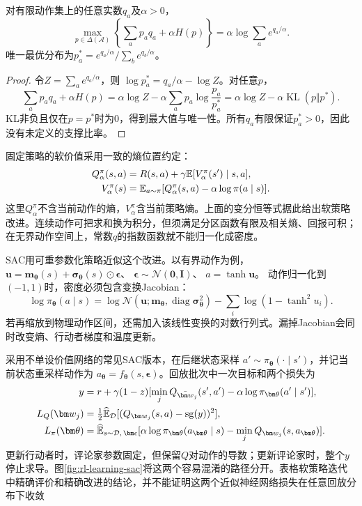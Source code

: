 \begin{theorem}[熵正则的变分恒等式]
  \label{thm:rl-learning-entropy-variational}
  对有限动作集上的任意实数$q_a$及$\alpha>0$，
  \[
    \max_{p\in\Delta(\mathcal A)}
       \left\{\sum_a p_a q_a+\alpha H(p)\right\}
      =\alpha\log\sum_a e^{q_a/\alpha}.
  \]
  唯一最优分布为$p_a^*=e^{q_a/\alpha}/\sum_b e^{q_b/\alpha}$。
\end{theorem}
\begin{proof}
  令$Z=\sum_a e^{q_a/\alpha}$，则
  $\log p_a^*=q_a/\alpha-\log Z$。对任意$p$，
  \[
    \sum_a p_aq_a+\alpha H(p)
      =\alpha\log Z
          -\alpha\sum_a p_a\log\frac{p_a}{p_a^*}
      =\alpha\log Z-\alpha\operatorname{KL}(p\Vert p^*).
  \]
  KL非负且仅在$p=p^*$时为0，得到最大值与唯一性。所有$q_a$有限保证$p_a^*>0$，因此没有未定义的支撑比率。
\end{proof}

固定策略的软价值采用一致的熵位置约定：
\begin{align}
  Q_\alpha^\pi(s,a)
    &=R(s,a)+\gamma\mathbb E[V_\alpha^\pi(s')\mid s,a],
       \notag\\
  V_\alpha^\pi(s)
    &=\mathbb E_{a\sim\pi}
        [Q_\alpha^\pi(s,a)-\alpha\log\pi(a\mid s)].
  \label{eq:rl-learning-soft-bellman}
\end{align}
这里$Q_\alpha^\pi$不含当前动作的熵，$V_\alpha^\pi$含当前策略熵。上面的变分恒等式据此给出软策略改进。连续动作可把求和换为积分，但须满足分区函数有限及相关熵、回报可积；在无界动作空间上，常数$q$的指数函数就不能归一化成密度。

SAC用可重参数化策略近似这个改进。以有界动作为例，
$\bm u=\bm m_{\bm\theta}(s)+\bm\sigma_{\bm\theta}(s)\odot\bm\epsilon$、
$\bm\epsilon\sim\mathcal N(\bm0,\bm I)$、
$a=\tanh\bm u$。
动作归一化到$(-1,1)$时，密度必须包含变换Jacobian：
\[
  \log\pi_{\bm\theta}(a\mid s)
    =\log\mathcal N(\bm u;\bm m_{\bm\theta},
                           \operatorname{diag}\bm\sigma_{\bm\theta}^2)
       -\sum_i\log(1-\tanh^2u_i).
\]
若再缩放到物理动作区间，还需加入该线性变换的对数行列式。漏掉Jacobian会同时改变熵、行动者梯度和温度更新。

采用不单设价值网络的常见SAC版本，在后继状态采样
$a'\sim\pi_{\bm\theta}(\cdot\mid s')$，并记当前状态重采样动作为
$a_{\bm\theta}=f_{\bm\theta}(s,\bm\epsilon)$。回放批次中一次目标和两个损失为
\begin{align}
  y&=r+\gamma(1-z)
       [\min_j Q_{\bar{\bm w}_j}(s',a')
                       -\alpha\log\pi_{\bm\theta}(a'\mid s')],
       \notag\\
  L_Q(\bm w_j)&=\tfrac12\widehat{\mathbb E}_{\mathcal D}
                           [(Q_{\bm w_j}(s,a)-\operatorname{sg}(y))^2],
       \notag\\
  L_\pi(\bm\theta)&=
       \widehat{\mathbb E}_{s\sim\mathcal D,\,\bm\epsilon}
       [\alpha\log\pi_{\bm\theta}(a_{\bm\theta}\mid s)
        -\min_j Q_{\bm w_j}(s,a_{\bm\theta})].
  \label{eq:rl-learning-sac-losses}
\end{align}
更新行动者时，评论家参数固定，但保留$Q$对动作的导数；更新评论家时，整个$y$停止求导。图\ref{fig:rl-learning-sac}将这两个容易混淆的路径分开。表格软策略迭代中精确评价和精确改进的结论，并不能证明这两个近似神经网络损失在任意回放分布下收敛

